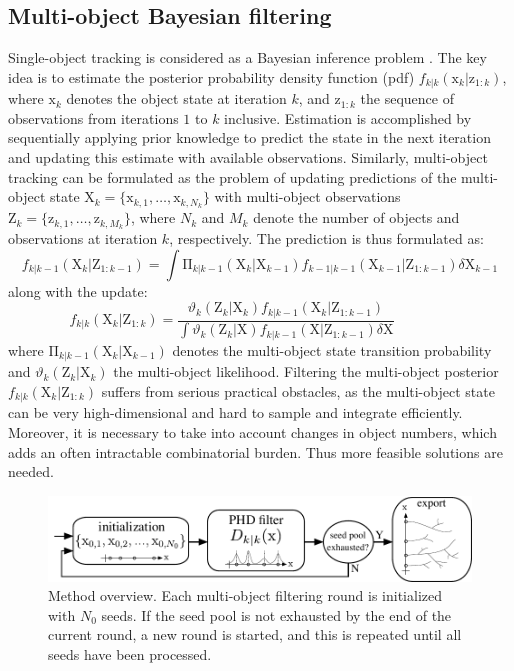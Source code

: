 \subsection{Multi-object Bayesian filtering} 
\label{ch3:ssec:multi-obj-bay-filt}
Single-object tracking is considered as a Bayesian inference problem \cite{bar2004estimation, sarkka2013bayesian}. The key idea is to estimate the posterior probability density function (pdf) $f_{k|k}(\mathrm{x}_k | \mathrm{z}_{1:k})$, where $\mathrm{x}_k$ denotes the object state at iteration $k$, and $\mathrm{z}_{1:k}$ the sequence of observations from iterations $1$ to $k$ inclusive. Estimation is accomplished by sequentially applying prior knowledge to predict the state in the next iteration and updating this estimate with available observations. Similarly, multi-object tracking can be formulated as the problem of updating predictions of the multi-object state $\mathrm{X}_k = \{\mathrm{x}_{k,1},\ldots,\mathrm{x}_{k,N_k}\}$ with multi-object observations $\mathrm{Z}_k = \{\mathrm{z}_{k,1},\ldots,\mathrm{z}_{k,M_k}\}$, where $N_k$ and $M_k$ denote the number of objects and observations at iteration $k$, respectively. The prediction is thus formulated as:
\begin{equation}
f_{k|k-1}(\mathrm{X}_k | \mathrm{Z}_{1:k-1}) = 
\int\!\mathrm{\Pi}_{k|k-1}(\mathrm{X}_k | \mathrm{X}_{k-1}) f_{k-1|k-1}(\mathrm{X}_{k-1}|\mathrm{Z}_{1:k-1}) \delta\mathrm{X}_{k-1}
\label{ch3:eq:prediction}
\end{equation}
along with the update:
\begin{equation}
f_{k|k}(\mathrm{X}_k|\mathrm{Z}_{1:k}) =
\frac{\vartheta_k(\mathrm{Z}_k|\mathrm{X}_k) f_{k|k-1}(\mathrm{X}_k|\mathrm{Z}_{1:k-1})}{\int\!\vartheta_k(\mathrm{Z}_k|\mathrm{X})f_{k|k-1}(\mathrm{X}|\mathrm{Z}_{1:k-1}) \delta\mathrm{X}}\qquad\qquad
\label{ch3:eq:update}
\end{equation}
where $\mathrm{\Pi}_{k|k-1}(\mathrm{X}_k | \mathrm{X}_{k-1})$ denotes the multi-object state transition probability and $\vartheta_k(\mathrm{Z}_k|\mathrm{X}_k)$ the multi-object likelihood. Filtering the multi-object posterior $f_{k|k}(\mathrm{X}_k | \mathrm{Z}_{1:k})$ suffers from serious practical obstacles, as the multi-object state can be very high-dimensional and hard to sample and integrate efficiently. Moreover, it is necessary to take into account changes in object numbers, which adds an often intractable combinatorial burden. Thus more feasible solutions are needed.
\begin{figure}
	\centering
	\includegraphics[width=0.8\linewidth]{fig1}
	\caption{Method overview. Each multi-object filtering round is initialized with $N_0$ seeds. If the seed pool is not exhausted by the end of the current round, a new round is started, and this is repeated until all seeds have been processed.}
	\label{ch3_fig1}
\end{figure}
